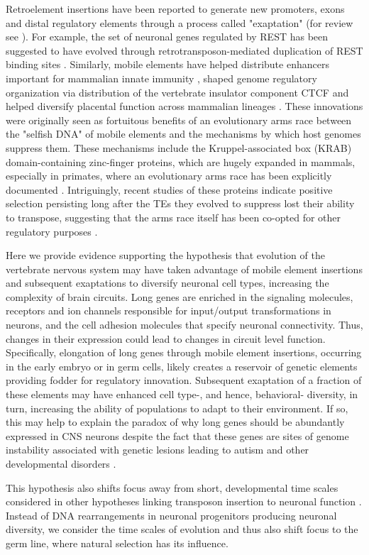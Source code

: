 Retroelement insertions have been reported to generate new promoters, exons and distal regulatory elements through a process called "exaptation" (for review see \cite{Chuong_2016}). For example, the set of neuronal genes regulated by REST has been suggested to have evolved through retrotransposon-mediated duplication of REST binding sites \cite{Johnson_2006}. Similarly, mobile elements have helped distribute enhancers important for mammalian innate immunity \cite{Chuong_2016a}, shaped genome regulatory organization via distribution of the vertebrate insulator component CTCF \cite{Schmidt_2012} and helped diversify placental function across mammalian lineages \cite{Chuong_2013}. These innovations were originally seen as fortuitous benefits of an evolutionary arms race between the "selfish DNA" of mobile elements and the mechanisms by which host genomes suppress them. These mechanisms include the Kruppel-associated box (KRAB) domain-containing zinc-finger proteins, which are hugely expanded in mammals, especially in primates, where an evolutionary arms race has been explicitly documented \cite{Jacobs_2014}. Intriguingly, recent studies of these proteins indicate positive selection persisting long after the TEs they evolved to suppress lost their ability to transpose, suggesting that the arms race itself has been co-opted for other regulatory purposes \cite{Imbeault_2017}. 

Here we provide evidence supporting the hypothesis that evolution of the vertebrate nervous system may have taken advantage of mobile element insertions and subsequent exaptations to diversify neuronal cell types, increasing the complexity of brain circuits. Long genes are enriched in the signaling molecules, receptors and ion channels responsible for input/output transformations in neurons, and the cell adhesion molecules that specify neuronal connectivity. Thus, changes in their expression could lead to changes in circuit level function. Specifically, elongation of long genes through mobile element insertions, occurring in the early embryo or in germ cells, likely creates a reservoir of genetic elements providing fodder for regulatory innovation. Subsequent exaptation of a fraction of these elements may have enhanced cell type-, and hence, behavioral- diversity, in turn, increasing the ability of populations to adapt to their environment. If so, this may help to explain the paradox of why long genes should be abundantly expressed in CNS neurons despite the fact that these genes are sites of genome instability associated with genetic lesions leading to autism and other developmental disorders \citep{Wei_2016}. 

This hypothesis also shifts focus away from short, developmental time scales considered in other hypotheses linking transposon insertion to neuronal function \citep{Muotri_2005,Richardson_2014,Perrat_2013}. Instead of DNA rearrangements in neuronal progenitors producing neuronal diversity, we consider the time scales of evolution and thus also shift focus to the germ line, where natural selection has its influence. 




